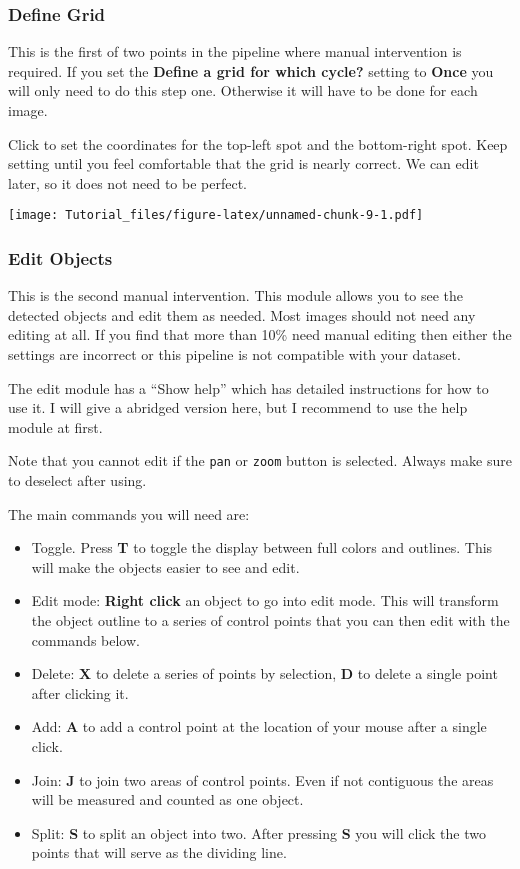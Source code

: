 \documentclass[
]{article}
\begin{document}
\hypertarget{define-grid}{%
\subsubsection{Define Grid}\label{define-grid}}

This is the first of two points in the pipeline where manual
intervention is required. If you set the \textbf{Define a grid for which
cycle?} setting to \textbf{Once} you will only need to do this step one.
Otherwise it will have to be done for each image.

Click to set the coordinates for the top-left spot and the bottom-right
spot. Keep setting until you feel comfortable that the grid is nearly
correct. We can edit later, so it does not need to be perfect.

\texttt{[image: Tutorial\_files/figure-latex/unnamed-chunk-9-1.pdf]}

\hypertarget{edit-objects}{%
\subsubsection{Edit Objects}\label{edit-objects}}

This is the second manual intervention. This module allows you to see
the detected objects and edit them as needed. Most images should not
need any editing at all. If you find that more than 10\% need manual
editing then either the settings are incorrect or this pipeline is not
compatible with your dataset.

The edit module has a ``Show help'' which has detailed instructions for
how to use it. I will give a abridged version here, but I recommend to
use the help module at first.

Note that you cannot edit if the \texttt{pan} or \texttt{zoom} button is
selected. Always make sure to deselect after using.

The main commands you will need are:

\begin{itemize}
\item
  Toggle. Press \textbf{T} to toggle the display between full colors and
  outlines. This will make the objects easier to see and edit.
\item
  Edit mode: \textbf{Right click} an object to go into edit mode. This
  will transform the object outline to a series of control points that
  you can then edit with the commands below.
\item
  Delete: \textbf{X} to delete a series of points by selection,
  \textbf{D} to delete a single point after clicking it.
\item
  Add: \textbf{A} to add a control point at the location of your mouse
  after a single click.
\item
  Join: \textbf{J} to join two areas of control points. Even if not
  contiguous the areas will be measured and counted as one object.
\item
  Split: \textbf{S} to split an object into two. After pressing
  \textbf{S} you will click the two points that will serve as the
  dividing line.
\end{itemize}
\end{document}
